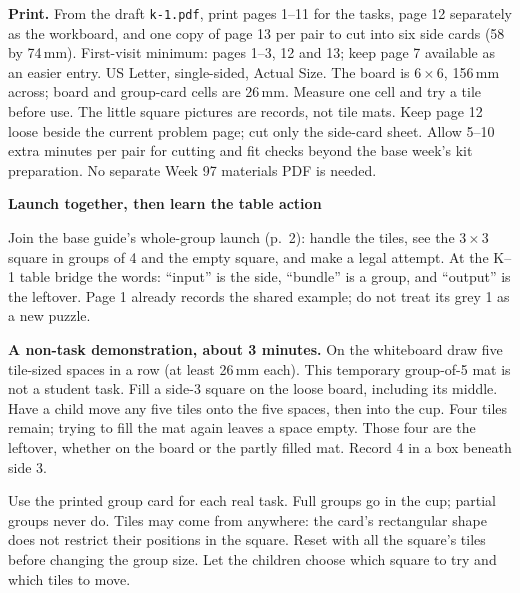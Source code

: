 \documentclass[11pt]{article}
\newcommand{\head}[1]{\par\textbf{\large #1}\par}
\begin{document}
\textbf{Print.} From the draft \texttt{k-1.pdf}, print pages 1--11 for the tasks, page 12 separately as the workboard, and one copy of page 13 per pair to cut into six side cards (58 by 74\,mm). First-visit minimum: pages 1--3, 12 and 13; keep page 7 available as an easier entry. US Letter, single-sided, Actual Size. The board is $6\times6$, 156\,mm across; board and group-card cells are 26\,mm. Measure one cell and try a tile before use. The little square pictures are records, not tile mats. Keep page 12 loose beside the current problem page; cut only the side-card sheet. Allow 5--10 extra minutes per pair for cutting and fit checks beyond the base week's kit preparation. No separate Week 97 materials PDF is needed.

\newpage
\head{Launch together, then learn the table action}
Join the base guide's whole-group launch (p.\ 2): handle the tiles, see the $3\times3$ square in groups of 4 and the empty square, and make a legal attempt. At the K--1 table bridge the words: ``input'' is the side, ``bundle'' is a group, and ``output'' is the leftover. Page 1 already records the shared example; do not treat its grey 1 as a new puzzle.

\textbf{A non-task demonstration, about 3 minutes.} On the whiteboard draw five tile-sized spaces in a row (at least 26\,mm each). This temporary group-of-5 mat is not a student task. Fill a side-3 square on the loose board, including its middle. Have a child move any five tiles onto the five spaces, then into the cup. Four tiles remain; trying to fill the mat again leaves a space empty. Those four are the leftover, whether on the board or the partly filled mat. Record 4 in a box beneath side 3.

\begin{center}
\end{center}
Use the printed group card for each real task. Full groups go in the cup; partial groups never do. Tiles may come from anywhere: the card's rectangular shape does not restrict their positions in the square. Reset with all the square's tiles before changing the group size. Let the children choose which square to try and which tiles to move.
\end{document}
